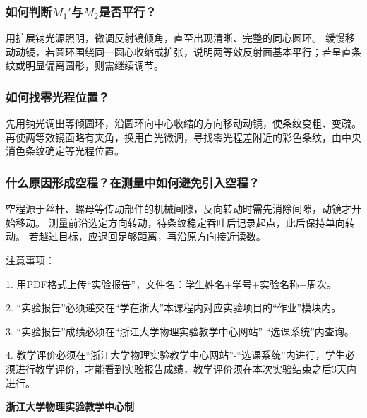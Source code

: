 \documentclass[10pt,a4paper]{ctexart} %
\begin{document}
    \subsubsection{如何判断\texorpdfstring{$M_1'$}{M1'}与\texorpdfstring{$M_2$}{M2}是否平行？}
    用扩展钠光源照明，微调反射镜倾角，直至出现清晰、完整的同心圆环。
    缓慢移动动镜，若圆环围绕同一圆心收缩或扩张，说明两等效反射面基本平行；若呈直条纹或明显偏离圆形，则需继续调节。

    \subsubsection{如何找零光程位置？}
    先用钠光调出等倾圆环，沿圆环向中心收缩的方向移动动镜，使条纹变粗、变疏。
    再使两等效镜面略有夹角，换用白光微调，寻找零光程差附近的彩色条纹，由中央消色条纹确定等光程位置。

    \subsubsection{什么原因形成空程？在测量中如何避免引入空程？}
    空程源于丝杆、螺母等传动部件的机械间隙，反向转动时需先消除间隙，动镜才开始移动。
    测量前沿选定方向转动，待条纹稳定吞吐后记录起点，此后保持单向转动。
    若越过目标，应退回足够距离，再沿原方向接近读数。

\vspace*{\fill} %
\noindent
\begin{minipage}{\textwidth}
  注意事项：

  \begingroup
    \setlength{\leftskip}{2em} %
    1. 用PDF格式上传“实验报告”，文件名：学生姓名+学号+实验名称+周次。

    2. “实验报告”必须递交在“学在浙大”本课程内对应实验项目的“作业”模块内。

    3. “实验报告”成绩必须在“浙江大学物理实验教学中心网站”-“选课系统”内查询。

    4. 教学评价必须在“浙江大学物理实验教学中心网站”-“选课系统”内进行，学生必须进行教学评价，才能看到实验报告成绩，教学评价须在本次实验结束之后3天内进行。\par
  \endgroup

  \begin{center}
    {\bfseries 浙江大学物理实验教学中心制}
  \end{center}
\end{minipage}
\end{document}
